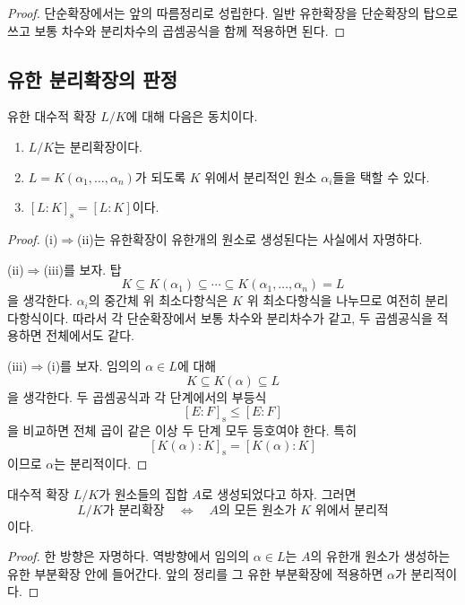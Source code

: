 \begin{proof}
단순확장에서는 앞의 따름정리로 성립한다. 일반 유한확장을 단순확장의 탑으로 쓰고 보통 차수와 분리차수의 곱셈공식을 함께 적용하면 된다.
\end{proof}

\subsection{유한 분리확장의 판정}

\begin{theorem}
유한 대수적 확장 $L/K$에 대해 다음은 동치이다.
\begin{enumerate}[label=(\roman*)]
  \item $L/K$는 분리확장이다.
  \item $L=K(\alpha_1,\dots,\alpha_n)$가 되도록 $K$ 위에서 분리적인 원소 $\alpha_i$들을 택할 수 있다.
  \item $[L:K]_{\mathrm s}=[L:K]$이다.
\end{enumerate}
\end{theorem}

\begin{proof}
(i)$\Rightarrow$(ii)는 유한확장이 유한개의 원소로 생성된다는 사실에서 자명하다.

(ii)$\Rightarrow$(iii)를 보자. 탑
\[
  K\subseteq K(\alpha_1)\subseteq\cdots
  \subseteq K(\alpha_1,\dots,\alpha_n)=L
\]
을 생각한다. $\alpha_i$의 중간체 위 최소다항식은 $K$ 위 최소다항식을 나누므로 여전히 분리다항식이다. 따라서 각 단순확장에서 보통 차수와 분리차수가 같고, 두 곱셈공식을 적용하면 전체에서도 같다.

(iii)$\Rightarrow$(i)를 보자. 임의의 $\alpha\in L$에 대해
\[
  K\subseteq K(\alpha)\subseteq L
\]
을 생각한다. 두 곱셈공식과 각 단계에서의 부등식
\[
  [E:F]_{\mathrm s}\le [E:F]
\]
을 비교하면 전체 곱이 같은 이상 두 단계 모두 등호여야 한다. 특히
\[
  [K(\alpha):K]_{\mathrm s}=[K(\alpha):K]
\]
이므로 $\alpha$는 분리적이다.
\end{proof}

\begin{corollary}[생성원 판정]
대수적 확장 $L/K$가 원소들의 집합 $A$로 생성되었다고 하자. 그러면
\[
  L/K\text{가 분리확장}
  \quad\Longleftrightarrow\quad
  A\text{의 모든 원소가 }K\text{ 위에서 분리적}
\]
이다.
\end{corollary}

\begin{proof}
한 방향은 자명하다. 역방향에서 임의의 $\alpha\in L$는 $A$의 유한개 원소가 생성하는 유한 부분확장 안에 들어간다. 앞의 정리를 그 유한 부분확장에 적용하면 $\alpha$가 분리적이다.
\end{proof}

